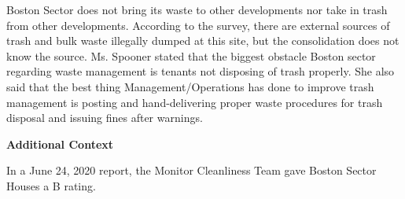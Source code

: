 Boston Sector does not bring its waste to other developments nor take in trash from other developments. According to the survey, there are external sources of trash and bulk waste illegally dumped at this site, but the consolidation does not know the source. Ms. Spooner stated that the biggest obstacle Boston sector regarding waste management is tenants not disposing of trash properly. She also said that the best thing Management/Operations has done to improve trash management is posting and hand-delivering proper waste procedures for trash disposal and issuing fines after warnings.

\textbf{Additional Context}  

In a June 24, 2020 report, the Monitor Cleanliness Team gave Boston Sector Houses a B rating.  